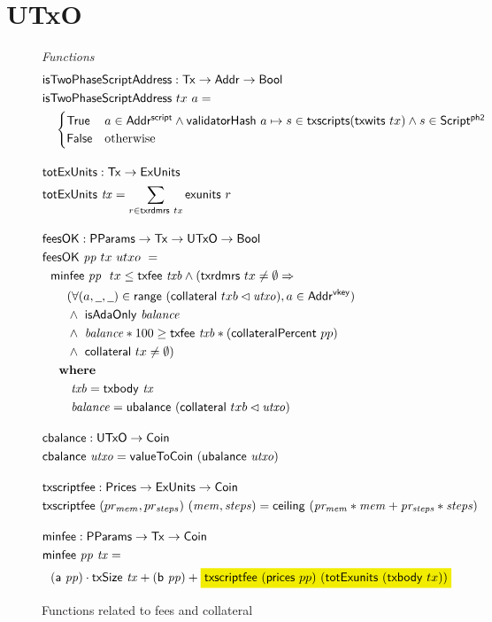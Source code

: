 \section{UTxO}
\label{sec:utxo}

\begin{figure*}[htb]
  \emph{Functions}
  \begin{align*}
    & \fun{isTwoPhaseScriptAddress} : \Tx \to \Addr \to \Bool \\
    & \fun{isTwoPhaseScriptAddress}~tx~a = \\
      &\quad\begin{cases}
        \True  & a \in \AddrScr \land \fun{validatorHash}~a \mapsto s \in \fun{txscripts} (\fun{txwits}~tx) \land s \in \ScriptPhTwo \\
        \False & \text{otherwise}
      \end{cases}
                 \nextdef
    & \fun{totExUnits} : \Tx \to \ExUnits \\
    & \fun{totExUnits}~\var{tx} = \sum_{r \in \fun{txrdmrs}~tx} \fun{exunits}~r
    \nextdef
    & \fun{feesOK} : \PParams \to \Tx \to \UTxO \to \Bool  \\
    & \fun{feesOK}~\var{pp}~tx~utxo~= \\
    &~~      \minfee{pp}~{tx} \leq \txfee{txb} \wedge (\fun{txrdmrs}~tx \neq \emptyset \Rightarrow \\
    &~~~~~~(\forall (a, \wcard, \wcard) \in \fun{range}~(\fun{collateral}~{txb} \restrictdom \var{utxo}), a \in \AddrVKey) \\
    &~~~~~~\wedge~ \fun{isAdaOnly}~\var{balance} \\
    &~~~~~~\wedge~ \var{balance}*100 \geq \txfee{txb} * (\fun{collateralPercent}~pp) \\
    &~~~~~~\wedge~ \fun{collateral}~{tx} \neq \emptyset) \\
    &~~      \where \\
    & ~~~~~~~ \var{txb} = \txbody{tx} \\
    & ~~~~~~~ \var{balance} = \fun{ubalance}~(\fun{collateral}~{txb} \restrictdom \var{utxo})
    \nextdef
    & \fun{cbalance} : \UTxO \to \Coin \\
    & \fun{cbalance}~\var{utxo} =  \fun{valueToCoin}~(\fun{ubalance}~\var{utxo})
    \nextdef
    & \fun{txscriptfee} : \Prices \to \ExUnits \to \Coin \\
    & \fun{txscriptfee}~(pr_{mem}, pr_{steps})~ (\var{mem, steps})
    = \fun{ceiling}~(\var{pr_{mem}}*\var{mem} + \var{pr_{steps}}*\var{steps})
    \nextdef
    &\fun{minfee} : \PParams \to \Tx \to \Coin \\
    &\fun{minfee}~\var{pp}~\var{tx} = \\
    &~~(\fun{a}~\var{pp}) \cdot \fun{txSize}~\var{tx} + (\fun{b}~\var{pp}) +
    \hldiff{\fun{txscriptfee}~(\fun{prices}~{pp})~(\fun{totExunits}~(\fun{txbody}~{tx}))}
  \end{align*}
  \caption{Functions related to fees and collateral}
  \label{fig:functions:utxo}
\end{figure*}

